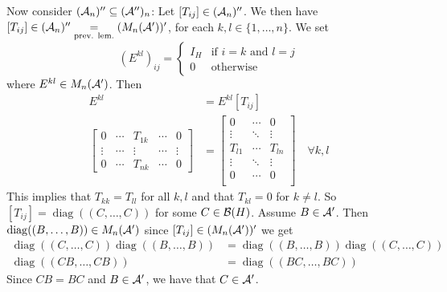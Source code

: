 \documentclass[10pt,english,a4paper]{article}
\theoremstyle{definition}
\DeclareMathOperator{\diag}{diag}
\begin{document}
Now consider $(\mathcal{A}_n)'' \subseteq (\mathcal{A}'')_n$:
Let $[T_{ij}] \in (\mathcal{A}_n)''$. We then have 
$[T_{ij}] \in (\mathcal{A}_n)'' \underset{\text{prev. lem.}}{=} (M_n(\mathcal{A}'))'$, for 
each $k,l \in \{1,\ldots,n\}$. 
We set 
\[(E^{kl})_{ij} = \begin{cases} 
I_H &  \text{if } i =k \text{ and } l=j \\
 0 &\text{otherwise} \end{cases}\] 
where $E^{kl} \in M_{n}(\mathcal{A}')$. Then 
\begin{align*}
    [T_{ij}]E^{kl} &= E^{kl}[T_{ij}] \\
    \begin{bmatrix} 
       0 &\cdots & T_{1k} &\cdots & 0 \\
       \vdots &\cdots & \vdots &\cdots &\vdots \\
       0 &\cdots & T_{nk} & \cdots & 0
    \end{bmatrix}
&=
    \begin{bmatrix} 
       0   &\cdots & 0 \\
       \vdots &\ddots &\vdots \\
       T_{l1} &  \cdots & T_{ln} \\
       \vdots  &\ddots &\vdots \\
       0   &\cdots & 0 \\
    \end{bmatrix}
\quad\forall k,l
\end{align*}
This implies that $T_{kk} = T_{ll}$ for all $k,l$
and that $T_{kl} = 0$ for $k\neq l$.
So $[T_{ij}] = \diag((C,\ldots,C))$
for some $C \in \mathcal{B}(H)$. Assume $B \in \mathcal{A}'$. Then $\diag((B,\ldots,B))\in M_n(\As')$
since $[T_{ij}] \in (M_n(\mathcal{A}'))'$ we get 
\begin{align*}
    \diag((C,\ldots, C))\diag((B,\ldots, B))
&= \diag((B,\ldots, B))\diag((C,\ldots, C))  \\
\diag((CB,\ldots, CB)) &= \diag((BC,\ldots, BC)) 
\end{align*}
Since $CB = BC$ and $B \in \mathcal{A}'$, we have that $C \in \mathcal{A}'$.
\end{document}
